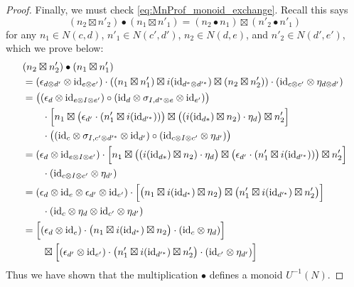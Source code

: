\documentclass[11pt,oneside,article]{memoir}
\begin{document}
\begin{proof}
   Finally, we must check \eqref{eq:MnProf_monoid_exchange}. Recall this says
   \[
      (n_2\boxtimes n'_2)\bullet(n_1\boxtimes n'_1)=(n_2\bullet n_1)\boxtimes(n'_2\bullet n'_1)
   \]
   for any $n_1\in N(c,d)$, $n'_1\in N(c',d')$, $n_2\in N(d,e)$, and $n'_2\in N(d',e')$, which we
   prove below:
   \begin{align*}
      &(n_2\boxtimes n'_2)\bullet(n_1\boxtimes n'_1) \\
      &= (\epsilon_{d\otimes d'}\otimes\mathrm{id}_{e\otimes e'})
         \cdot \left((n_1\boxtimes n'_1)\boxtimes i(\mathrm{id}_{d^*\otimes d'^{*}})
            \boxtimes(n_2\boxtimes n'_2)\right)
         \cdot (\mathrm{id}_{c\otimes c'}\otimes\eta_{d\otimes d'}) \\
      &= \bigl((\epsilon_d\otimes\mathrm{id}_{e\otimes I\otimes e'})
            \circ(\mathrm{id}_d\otimes\sigma_{I,d^*\otimes e}\otimes\mathrm{id}_{e'})\bigr) \\
      &\qquad \cdot \Bigl[n_1\boxtimes\bigl(\epsilon_{d'}\cdot(n'_1\boxtimes i(\mathrm{id}_{d'^{*}}))\bigr)
            \boxtimes \bigl((i(\mathrm{id}_{d*})\boxtimes n_2)\cdot\eta_d\bigr)\boxtimes n'_2\Bigr] \\
      &\qquad \cdot \bigl((\mathrm{id}_c\otimes\sigma_{I,c'\otimes d'^*}\otimes\mathrm{id}_{d'})
            \circ (\mathrm{id}_{c\otimes I\otimes c'}\otimes\eta_{d'}) \bigr) \\
      &= (\epsilon_d\otimes\mathrm{id}_{e\otimes I\otimes e'})
         \cdot \Bigl[n_1\boxtimes\bigl((i(\mathrm{id}_{d*})\boxtimes n_2)\cdot\eta_d\bigr)
            \boxtimes \bigl(\epsilon_{d'}\cdot(n'_1\boxtimes i(\mathrm{id}_{d'^{*}}))\bigr)
            \boxtimes n'_2\Bigr] \\
      &\qquad \cdot (\mathrm{id}_{c\otimes I\otimes c'}\otimes\eta_{d'}) \\
      &= (\epsilon_d\otimes\mathrm{id}_e\otimes\epsilon_{d'}\otimes\mathrm{id}_{e'})
         \cdot \Bigl[\bigl(n_1\boxtimes i(\mathrm{id}_{d^*})\boxtimes n_2\bigr)
            \boxtimes \bigl(n'_1\boxtimes i(\mathrm{id}_{d'^*})\boxtimes n'_2\bigr)\Bigr] \\
      &\qquad \cdot(\mathrm{id}_c\otimes\eta_d\otimes\mathrm{id}_{c'}\otimes\eta_{d'}) \\
      &= \Bigl[(\epsilon_d\otimes\mathrm{id}_e)
            \cdot \bigl(n_1\boxtimes i(\mathrm{id}_{d^*})\boxtimes n_2\bigr)
            \cdot (\mathrm{id}_c\otimes\eta_d)\Bigr] \\
      &\qquad \boxtimes \Bigl[(\epsilon_{d'}\otimes\mathrm{id}_{e'})
            \cdot \bigl(n'_1\boxtimes i(\mathrm{id}_{d'^*})\boxtimes n'_2\bigr)
            \cdot (\mathrm{id}_{c'}\otimes\eta_{d'})\Bigr]
   \end{align*}
   Thus we have shown that the multiplication $\bullet$ defines a monoid $U^{-1}(N)$.


\end{proof}
\end{document}
